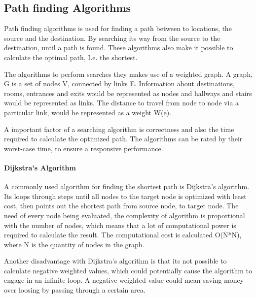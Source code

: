\subsection{Path finding Algorithms}

  Path finding algorithms is used for finding a path between to locations, the source and the destination. By searching its way from the source to the destination, until a path is found. These algorithms also make it possible to calculate the optimal path, I.e. the shortest.

  The algorithms to perform searches they makes use of a weighted graph. A graph, G is a set of nodes V, connected by links E.
  Information about destinations, rooms, entrances and exits would be represented as nodes and hallways and stairs would be represented as links. The distance to travel from node to node via a particular link, would be represented as a weight W(e).

  A important factor of a searching algorithm is correctness and also the time required to calculate the optimized path.
  The algorithms can be rated by their worst-case time, to ensure a responsive performance.



  \paragraph{Dijkstra's Algorithm}

  A commonly used algorithm for finding the shortest path is Dijkstra's algorithm. Its loops through steps until all nodes to the target node is optimized with least cost, then points out the shortest path from source node, to target node. The need of every node being evaluated, the complexity of algorithm is proportional with the number of nodes, which means that a lot of computational power is required to calculate the result. The computational cost is calculated O(N*N), where N is the quantity of nodes in the graph.

  Another disadvantage with Dijkstra's algorithm is that its not possible to calculate negative weighted values, which could potentially cause the algorithm to engage in an infinite loop. A negative weighted value could mean saving money over loosing by passing through a certain area.

